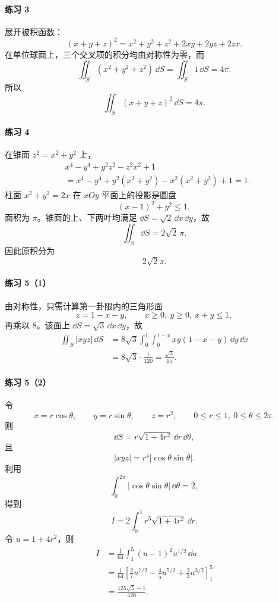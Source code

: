 \paragraph{练习 3}
\begin{xsolution}
展开被积函数：
\[
  (x+y+z)^2=x^2+y^2+z^2+2xy+2yz+2zx.
\]
在单位球面上，三个交叉项的积分均由对称性为零，而
\[
  \iint_S(x^2+y^2+z^2)\,\dd S=\iint_S1\,\dd S=4\pi.
\]
所以
\[
  \iint_S(x+y+z)^2\,\dd S=4\pi.
\]
\end{xsolution}

\paragraph{练习 4}
\begin{xsolution}
在锥面 $z^2=x^2+y^2$ 上，
\begin{align*}
&x^4-y^4+y^2z^2-z^2x^2+1\\
&=x^4-y^4+y^2(x^2+y^2)-x^2(x^2+y^2)+1=1.
\end{align*}
柱面 $x^2+y^2=2x$ 在 $xOy$ 平面上的投影是圆盘
\[
  (x-1)^2+y^2\le1,
\]
面积为 $\pi$。锥面的上、下两叶均满足 $\dd S=\sqrt2\,\dd x\,\dd y$，故
\[
  \iint_S\dd S=2\sqrt2\,\pi.
\]
因此原积分为
\[
  \boxed{2\sqrt2\pi}.
\]
\end{xsolution}

\paragraph{练习 5（1）}
\begin{xsolution}
由对称性，只需计算第一卦限内的三角形面
\[
  z=1-x-y,\qquad x\ge0,\ y\ge0,\ x+y\le1,
\]
再乘以 $8$。该面上 $\dd S=\sqrt3\,\dd x\,\dd y$，故
\begin{align*}
\iint_S|xyz|\,\dd S
&=8\sqrt3\int_0^1\int_0^{1-x}xy(1-x-y)\,\dd y\,\dd x\\
&=8\sqrt3\cdot\frac1{120}
=\frac{\sqrt3}{15}.
\end{align*}
\end{xsolution}

\paragraph{练习 5（2）}
\begin{xsolution}
令
\[
  x=r\cos\theta,\qquad y=r\sin\theta,\qquad z=r^2,
  \qquad 0\le r\le1,\ 0\le\theta\le2\pi.
\]
则
\[
  \dd S=r\sqrt{1+4r^2}\,\dd r\,\dd\theta,
\]
且
\[
  |xyz|=r^4|\cos\theta\sin\theta|.
\]
利用
\[
  \int_0^{2\pi}|\cos\theta\sin\theta|\,\dd\theta=2,
\]
得到
\[
  I=2\int_0^1r^5\sqrt{1+4r^2}\,\dd r.
\]
令 $u=1+4r^2$，则
\begin{align*}
I
&=\frac1{64}\int_1^5(u-1)^2u^{1/2}\,\dd u\\
&=\frac1{64}\left[\frac27u^{7/2}-\frac45u^{5/2}+\frac23u^{3/2}\right]_1^5\\
&=\frac{125\sqrt5-1}{420}.
\end{align*}
\end{xsolution}

